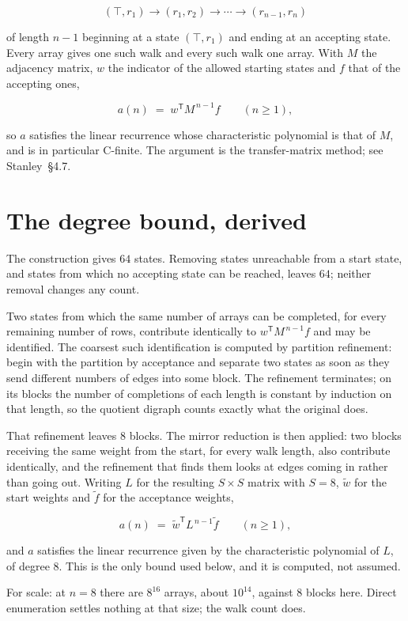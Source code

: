 \documentclass[11pt]{article}
\theoremstyle{definition}
\begin{document}
\[(\top,r_1) \to (r_1,r_2) \to \cdots \to (r_{n-1},r_n)\]

of length $n-1$ beginning at a state $(\top,r_1)$ and ending at an accepting state. Every array gives one such walk and every such walk one array. With $M$ the adjacency matrix, $w$ the indicator of the allowed starting states and $f$ that of the accepting ones,

\[a(n) \;=\; w^{\mathsf T} M^{\,n-1} f \qquad (n \ge 1),\]

so $a$ satisfies the linear recurrence whose characteristic polynomial is that of $M$, and is in particular C-finite. The argument is the transfer-matrix method; see Stanley~\S4.7.

\section{The degree bound, derived}

The construction gives $64$ states. Removing states unreachable from a start state, and states from which no accepting state can be reached, leaves $64$; neither removal changes any count.

Two states from which the same number of arrays can be completed, for every remaining number of rows, contribute identically to $w^{\mathsf T}M^{\,n-1}f$ and may be identified. The coarsest such identification is computed by partition refinement: begin with the partition by acceptance and separate two states as soon as they send different numbers of edges into some block. The refinement terminates; on its blocks the number of completions of each length is constant by induction on that length, so the quotient digraph counts exactly what the original does.

That refinement leaves $8$ blocks. The mirror reduction is then applied: two blocks receiving the same weight from the start, for every walk length, also contribute identically, and the refinement that finds them looks at edges coming in rather than going out. Writing $L$ for the resulting $S \times S$ matrix with $S = 8$, $\tilde w$ for the start weights and $\tilde f$ for the acceptance weights,

\[a(n) \;=\; \tilde w^{\mathsf T} L^{\,n-1} \tilde f \qquad (n \ge 1),\]

and $a$ satisfies the linear recurrence given by the characteristic polynomial of $L$, of degree $8$. This is the only bound used below, and it is computed, not assumed.

For scale: at $n = 8$ there are $8^{16}$ arrays, about $10^{14}$, against $8$ blocks here. Direct enumeration settles nothing at that size; the walk count does.
\end{document}
